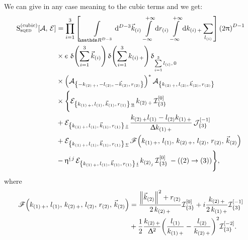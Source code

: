 We can give in any case meaning to the cubic terms
and we get:\footnotemark{}
\begin{equation}
  \begin{split}
    \rS_{\text{s}\qed}^{(\text{cubic})}\qty[ \cA,\, \cE ]
    & =
    \finiteprod{i}{1}{3}
    \qty[%
      \int\limits_{\R^{D-3}} \dd[D-3]{\vec{k}_{\qty(i)}}\,
      \infinfint{r_{\qty(i)}}\,
      \infinfint{k_{\qty(i)\, +}}
      \sum_{l_{\qty(i)}}
    ]\,
    \qty(2\pi)^{D-1}
    \\
    & \times
    e~
    \delta\qty(\finitesum{i}{1}{3} \vec{k}_{\qty(i)})\,
    \delta\qty(\finitesum{i}{1}{3} k_{\qty(i)\, +})\,
    \delta_{\finitesum{i}{1}{3} l_{\qty(i)},\, 0}\,
    \\
    & \times
    \qty(\cA_{\mkmkrN{2}})^*\, \cA_{\kmkrN{3}}
    \\
    & \times
    \Biggl\lbrace
      \polN{u}{1}\,
      k_{\qty(2)\, +}\,
      \cI_{\qty{3}}^{\qty[0]}
      \\
      & +
      \polN{z}{1}\,
      \frac{%
        k_{\qty(2)\, +} l_{\qty(1)}
        -
        l_{\qty(2)} k_{\qty(1)\, +}
      }{\Delta k_{\qty(1)\, +}}\,
      \cJ_{\qty{3}}^{\qty[-1]}
      \\
      & +
      \polN{v}{1}\,
      \ccF\qty(k_{\qty(1)\, +},\, l_{\qty(1)},\, k_{\qty(2)\, +},\, l_{\qty(2)},\, r_{\qty(2)},\, \vec{k}_{\qty(2)})
      \\
      & -
      \eta^{\underi\, j}\,
      \polN{i}{1}\,
      k_{\qty(2)_j}\,
      \cI_{\qty{3}}^{\qty[0]}\,
      -
      \qty( \qty(2) \rightarrow \qty(3) )
    \Biggr\rbrace,
  \label{eq:sQED_cubic_final}   
  \end{split}
\end{equation}
where
\begin{equation}
  \begin{split}
    \ccF\qty(k_{\qty(1)\, +},\, l_{\qty(1)},\, k_{\qty(2)\, +},\, l_{\qty(2)},\, r_{\qty(2)},\, \vec{k}_{\qty(2)})
    & =
    \frac{\norm{\vec{k}_{\qty(2)}}^2 + r_{\qty(2)}}{2\, k_{\qty(2)\, +}} \cI_{\qty{3}}^{\qty[0]}
    +
    i
    \frac{k_{\qty(2)\, +}}{2\, k_{\qty(1)\, +}}
    \cI_{\qty{3}}^{\qty[-1]}
    \\
    & +
    \frac{1}{2} \frac{k_{\qty(2)\, +}}{\Delta^2}
    \qty(%
      \frac{l_{\qty(1)}}{k_{\qty(1)\, +}}
      -
      \frac{l_{\qty(2)}}{k_{\qty(2)\, +}}
    )^2
    \cI_{\qty{3}}^{\qty[-2]}.
  \end{split}
\end{equation}
